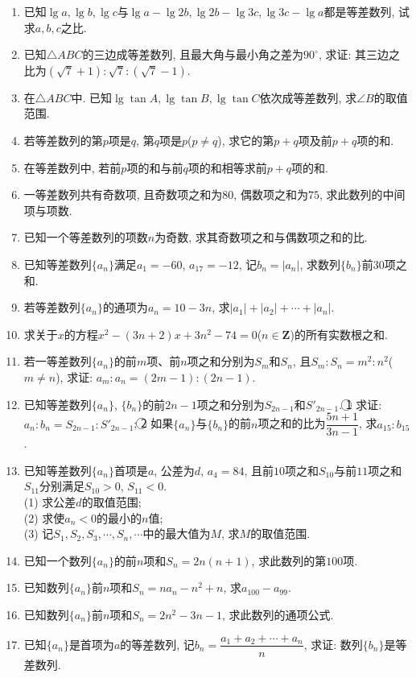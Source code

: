 \documentclass[10pt,a4paper]{article}
\begin{document}
\begin{enumerate}[1.]
\item 已知$\lg a,\lg b,\lg c$与$\lg a-\lg 2b,\lg 2b-\lg 3c,\lg 3c-\lg a$都是等差数列, 试求$a,b,c$之比.
\item 已知$\triangle ABC$的三边成等差数列, 且最大角与最小角之差为$90^\circ$, 求证: 其三边之比为$(\sqrt 7+1):\sqrt 7:(\sqrt 7-1)$.
\item 在$\triangle ABC$中. 已知$\lg \tan A,\lg \tan B,\lg \tan C$依次成等差数列, 求$\angle B$的取值范围.
\item 若等差数列的第$p$项是$q$, 第$q$项是$p$($p\ne q$), 求它的第$p+q$项及前$p+q$项的和.
\item 在等差数列中, 若前$p$项的和与前$q$项的和相等求前$p+q$项的和.
\item 一等差数列共有奇数项, 且奇数项之和为$80$, 偶数项之和为$75$, 求此数列的中间项与项数.
\item 已知一个等差数列的项数$n$为奇数, 求其奇数项之和与偶数项之和的比.
\item 已知等差数列$\{a_n\}$满足$a_1=-60$, $a_{17}=-12$, 记$b_n=|a_n|$, 求数列$\{b_n\}$前$30$项之和.
\item 若等差数列$\{a_n\}$的通项为$a_n=10-3n$, 求$|a_1|+|a_2|+\cdots +|a_n|$.
\item 求关于$x$的方程$x^2-(3n+2)x+3n^2-74=0$($n\in \mathbf{Z}$)的所有实数根之和.
\item 若一等差数列$\{a_n\}$的前$m$项、前$n$项之和分别为$S_m$和$S_n$, 且$S_m:S_n=m^2:n^2$($m\ne n$), 求证: $a_m:a_n=(2m-1):(2n-1)$.
\item 已知等差数列$\{a_n\}$, $\{b_n\}$的前$2n-1$项之和分别为$S_{2n-1}$和$S'_{2n-1}$.
\textcircled{1} 求证: $a_n:b_n=S_{2n-1}:S'_{2n-1}$;
\textcircled{2} 如果$\{a_n\}$与$\{b_n\}$的前$n$项之和的比为$\dfrac{5n+1}{3n-1}$, 求$a_{15}:b_{15}$.
\item 已知等差数列$\{a_n\}$首项是$a$, 公差为$d$, $a_4=84$, 且前$10$项之和$S_{10}$与前$11$项之和$S_{11}$分别满足$S_{10}>0$, $S_{11}<0$.\\
(1) 求公差$d$的取值范围;\\
(2) 求使$a_n<0$的最小的$n$值;\\
(3) 记$S_1,S_2,S_3,\cdots ,S_n,\cdots$中的最大值为$M$, 求$M$的取值范围.
\item 已知一个数列$\{a_n\}$的前$n$项和$S_n=2n(n+1)$, 求此数列的第$100$项.
\item 已知数列$\{a_n\}$前$n$项和$S_n=na_n-n^2+n$, 求$a_{100}-a_{99}$.
\item 已知数列$\{a_n\}$前$n$项和$S_n=2n^2-3n-1$, 求此数列的通项公式.
\item 已知$\{a_n\}$是首项为$a$的等差数列, 记$b_n=\dfrac{a_1+a_2+\cdots +a_n}n$, 求证: 数列$\{b_n\}$是等差数列.

\end{enumerate}
\end{document}
